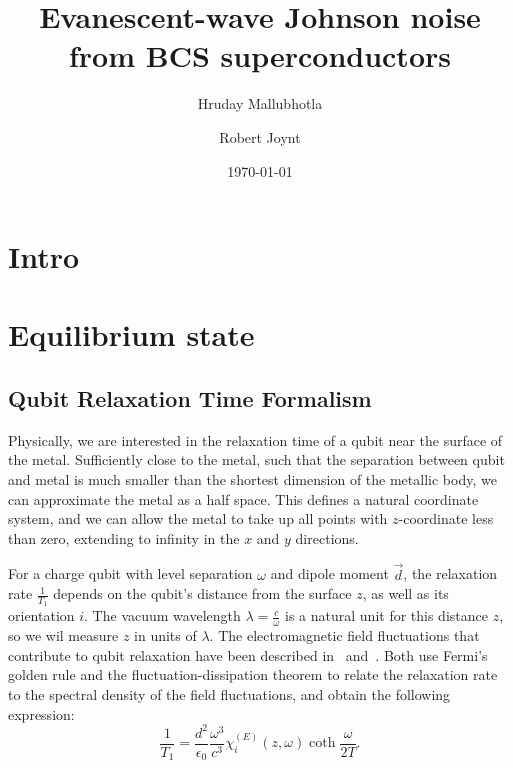 \documentclass[%
 preprint,
 amsmath,amssymb,
 aps,
]{revtex4-2}
\begin{document}
\title{Evanescent-wave Johnson noise from BCS superconductors}

\author{Hruday Mallubhotla}
\author{Robert Joynt}

\date{\today}


\maketitle

\tableofcontents

\section{Intro} \label{sec:intro}
\section{Equilibrium state} \label{sec:equilibrium}
\subsection{Qubit Relaxation Time Formalism} \label{subsec:relaxtime}
Physically, we are interested in the relaxation time of a qubit near the surface of the metal.
Sufficiently close to the metal, such that the separation between qubit and metal is much smaller than the shortest dimension of the metallic body, we can approximate the metal as a half space.
This defines a natural coordinate system, and we can allow the metal to take up all points with $z$-coordinate less than zero, extending to infinity in the $x$ and $y$ directions.

For a charge qubit with level separation $\omega$ and dipole moment $\vec{d}$, the relaxation rate $\frac{1}{T_1}$ depends on the qubit's distance from the surface $z$, as well as its orientation $i$.
The vacuum wavelength $\lambda = \frac{c}{\omega}$ is a natural unit for this distance $z$, so we wil measure $z$ in units of $\lambda$.
The electromagnetic field fluctuations that contribute to qubit relaxation have been described in~\cite{QubitRelax} and~\cite{Henkel1999}.
Both use Fermi's golden rule and the fluctuation-dissipation theorem to relate the relaxation rate to the spectral density of the field fluctuations, and obtain the following expression:
\begin{equation}
	\frac{1}{T_1} = \frac{d^2}{\epsilon_0} \frac{\omega^3}{c^3} \chi_{i}^{(E)}(z, \omega) \coth\frac{\omega}{2 T}.
\end{equation}
\end{document}
